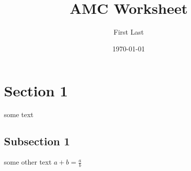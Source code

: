\documentclass{article}%
\title{AMC Worksheet}%
\author{First Last}%
\date{\today}%
\begin{document}
%
\normalsize%
\section{Section 1}%
\label{sec:Section1}%
some text%
\subsection{Subsection 1}%
\label{subsec:Subsection1}%
some other text%
$a + b = \frac{a}{b}$

%
\end{document}

